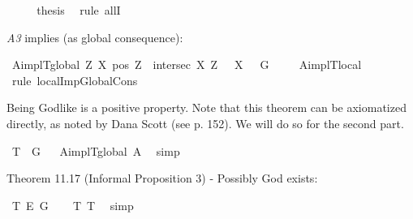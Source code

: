 \begin{isabellebody}
\ \isanewline
\ \ \isamarkupfalse%
\ {\isacharquery}thesis\ \isamarkupfalse%
\ {\isacharparenleft}rule\ allI{\isacharparenright}\isanewline
{}\isamarkupfalse%
%
\endisatagproof
{\isafoldproof}%
%
\isadelimproof
%
\endisadelimproof
%
\begin{isamarkuptext}%
\emph{A3} implies  (as global consequence):%
\end{isamarkuptext}\isamarkuptrue%
\isamarkupfalse%
\ A{}implT{}{\isacharunderscore}global{\isacharcolon}\ {\isachardoublequoteopen}{\isasymlfloor}\isactrlbold {\isasymforall}Z\ X{\isachardot}\ {\isacharparenleft}pos\ Z\ \isactrlbold {\isasymand}\ intersec\ X\ Z{\isacharparenright}\ \isactrlbold {\isasymrightarrow}\ {\isasymP}\ X{\isasymrfloor}\ {\isasymlongrightarrow}\ {\isasymlfloor}{\isasymP}\ G{\isasymrfloor}{\isachardoublequoteclose}\ \isanewline
%
\isadelimproof
\ \ %
\endisadelimproof
%
\isatagproof
{}\isamarkupfalse%
\ A{}implT{}{\isacharunderscore}local\ \isamarkupfalse%
\ {\isacharparenleft}rule\ localImpGlobalCons{\isacharparenright}%
\endisatagproof
{\isafoldproof}%
%
\isadelimproof
%
\endisadelimproof
%
\begin{isamarkuptext}%
Being Godlike is a positive property. Note that this theorem can be axiomatized directly,
as noted by Dana Scott (see \cite{Fitting} p. 152). We will do so for the second part.%
\end{isamarkuptext}\isamarkuptrue%
\isamarkupfalse%
\ T{}{\isacharcolon}\ {\isachardoublequoteopen}{\isasymlfloor}{\isasymP}\ G{\isasymrfloor}{\isachardoublequoteclose}%
\isadelimproof
\ %
\endisadelimproof
%
\isatagproof
{}\isamarkupfalse%
\ A{}implT{}{\isacharunderscore}global\ A{}\ \isamarkupfalse%
\ simp%
\endisatagproof
{\isafoldproof}%
%
\isadelimproof
%
\endisadelimproof
%
\begin{isamarkuptext}%
Theorem 11.17 (Informal Proposition 3) - Possibly God exists:%
\end{isamarkuptext}\isamarkuptrue%
\isamarkupfalse%
\ T{}{\isacharcolon}\ {\isachardoublequoteopen}{\isasymlfloor}\isactrlbold {\isasymdiamond}\isactrlbold {\isasymexists}\isactrlsup E\ G{\isasymrfloor}{\isachardoublequoteclose}%
\isadelimproof
\ \ %
\endisadelimproof
%
\isatagproof
{}\isamarkupfalse%
\ T{}\ T{}\ \isamarkupfalse%
\ simp\isanewline
%
\endisatagproof
{\isafoldproof}%
%
\isadelimproof
%
\endisadelimproof
%
\isadelimtheory
%
\endisadelimtheory
%
\isatagtheory
%
\endisatagtheory
{\isafoldtheory}%
%
\isadelimtheory
%
\endisadelimtheory
%
\end{isabellebody}%
